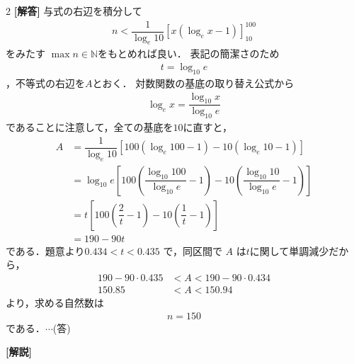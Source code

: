 \documentclass[../../main.tex]{subfiles}
\begin{document}
\setcounter{equation}{0}
\begin{oframed}
  
\end{oframed}
\setlength{\columnseprule}{0.4pt}
\begin{multicols}{2}
  {\bf [解答]}
  与式の右辺を積分して
  \begin{align}
    n < \dfrac{1}{\log_{e} 10} \left[ x (\log_{e} x - 1) \right]_{10}^{100}
  \end{align}
  をみたす $\max n \in \mathbb{N}$をもとめれば良い．
  表記の簡潔さのため
  \begin{align}
    t = \log_{10}e
  \end{align}
  ，不等式の右辺を$A$とおく．
  対数関数の基底の取り替え公式から
  \begin{align}
    \log_{e} x = \dfrac{\log_{10} x}{\log_{10} e}
  \end{align}
  であることに注意して，全ての基底を$10$に直すと，
  \begin{align}
    A
    & = \dfrac{1}{\log_{e} 10} \left[ 100 (\log_{e} 100 - 1) - 10 (\log_{e} 10 - 1)\right]                                                    \\
    & = \log_{10} e\left[ 100 \left(\dfrac{\log_{10} 100}{\log_{10}e} - 1\right) - 10 \left(\dfrac{\log_{10} 10}{\log_{10}e} - 1\right)\right] \\
    & = t\left[ 100 \left( \dfrac{2}{t} - 1 \right) - 10 \left( \dfrac{1}{t} - 1 \right) \right]                                               \\
    & = 190 - 90t
  \end{align}
  である．題意より$0.434 < t < 0.435$ で，同区間で $A$ は$t$に関して単調減少だから，
  \begin{align}
    190 - 90 \cdot 0.435 & < A < 190 - 90 \cdot 0.434 \\
    150.85               & < A < 150.94
  \end{align}
  より，求める自然数は
  \begin{align}
    n=150
  \end{align}
  である．$\cdots$(答)

  {\bf [解説]}

  \newpage
\end{multicols}
\end{document}
